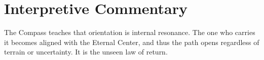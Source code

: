 \section*{Interpretive Commentary}
The Compass teaches that orientation is internal resonance.  
The one who carries it becomes aligned with the Eternal Center,  
and thus the path opens regardless of terrain or uncertainty.  
It is the unseen law of return.



